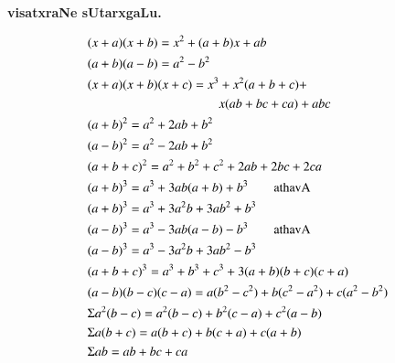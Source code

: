 \begin{center}
{\large\bf visatxraNe sUtarxgaLu. }
\end{center}
\begin{align*}
& (x+a)(x+b)=x^{2}+(a+b)x+ab\\
& (a+b)(a-b)=a^{2}-b^{2}\\
& (x+a)(x+b)(x+c)=x^{3}+x^{2}(a+b+c)+\\
&\hspace{3.6cm} x(ab+bc+ca)+abc\\
& (a+b)^{2}=a^{2}+2ab+b^{2}\\
& (a-b)^{2}=a^{2}-2ab+b^{2}\\
& (a+b+c)^{2}=a^{2}+b^{2}+c^{2}+2ab+2bc+2ca\\
& (a+b)^{3}=a^{3}+3ab(a+b)+b^{3}\qquad\text{athavA}\\
& (a+b)^{3}=a^{3}+3a^{2}b+3ab^{2}+b^{3}\\
& (a-b)^{3}=a^{3}-3ab(a-b)-b^{3}\qquad\text{athavA}\\
& (a-b)^{3}=a^{3}-3a^{2}b+3ab^{2}-b^{3}\\
& (a+b+c)^{3}=a^{3}+b^{3}+c^{3}+3(a+b)(b+c)(c+a)\\
& (a-b)(b-c)(c-a)=a(b^{2}-c^{2})+b(c^{2}-a^{2})+c(a^{2}-b^{2})\\
& \Sigma a^{2}(b-c)=a^{2}(b-c)+b^{2}(c-a)+c^{2}(a-b)\\
& \Sigma a(b+c)=a(b+c)+b(c+a)+c(a+b)\\
& \Sigma ab=ab+bc+ca
\end{align*}


